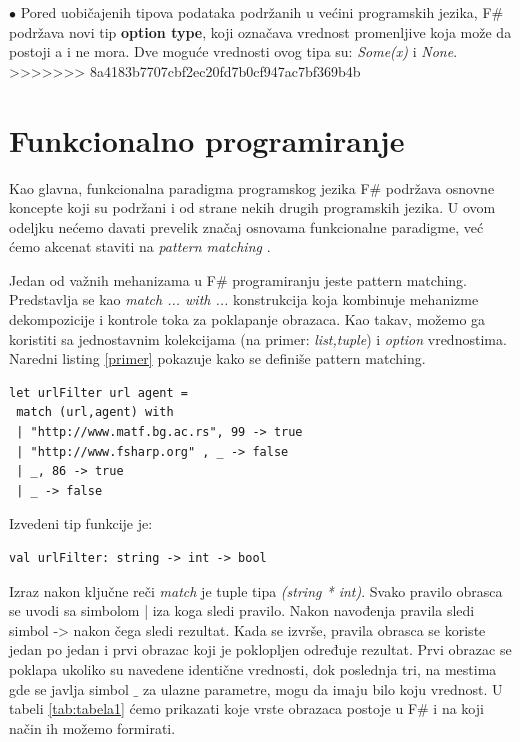 \documentclass[a4paper]{article}
\begin{document}
	$\bullet$ Pored uobičajenih tipova podataka podržanih u većini programskih jezika, F\# podržava novi tip \textbf{option type}, koji označava vrednost promenljive koja može da postoji a i ne mora. Dve moguće vrednosti ovog tipa su: {\em Some(x)} i {\em None}.
>>>>>>> 8a4183b7707cbf2ec20fd7b0cf947ac7bf369b4b

\section{Funkcionalno programiranje}


Kao glavna, funkcionalna paradigma programskog jezika F\# podržava osnovne koncepte koji su podržani i od strane nekih drugih programskih jezika. U ovom odeljku nećemo davati prevelik značaj osnovama funkcionalne paradigme, već ćemo akcenat staviti na {\em pattern matching} \cite{expertFS}.

Jedan od važnih mehanizama u F\# programiranju jeste pattern matching. Predstavlja se kao {\em match ... with ...} konstrukcija koja kombinuje mehanizme dekompozicije i kontrole toka za poklapanje obrazaca. Kao takav, možemo ga koristiti sa  jednostavnim kolekcijama (na primer: {\em list,tuple}) i {\em option} vrednostima. Naredni listing \ref{primer} pokazuje kako se definiše pattern matching.
\\
\begin{lstlisting}[caption={Primer pattern matching-a \cite{expertFS}},frame=single, label=primer]
let urlFilter url agent =
 match (url,agent) with
 | "http://www.matf.bg.ac.rs", 99 -> true
 | "http://www.fsharp.org" , _ -> false
 | _, 86 -> true
 | _ -> false
\end{lstlisting} 

Izvedeni tip funkcije je: \\

\begin{lstlisting}
val urlFilter: string -> int -> bool
\end{lstlisting}

Izraz nakon ključne reči {\em match} je tuple tipa {\em (string * int)}. Svako pravilo obrasca se uvodi sa simbolom | iza koga sledi pravilo. Nakon navođenja pravila sledi simbol -> nakon čega sledi rezultat. Kada se izvrše, pravila obrasca se koriste jedan po jedan i prvi obrazac koji je poklopljen određuje rezultat. Prvi obrazac se poklapa ukoliko su navedene identične vrednosti, dok poslednja tri, na mestima gde se javlja simbol $\_$ za ulazne parametre, mogu da imaju bilo koju vrednost. U tabeli \ref{tab:tabela1} ćemo prikazati koje vrste obrazaca postoje u F\# i na koji način ih možemo formirati.
 
\end{document}
